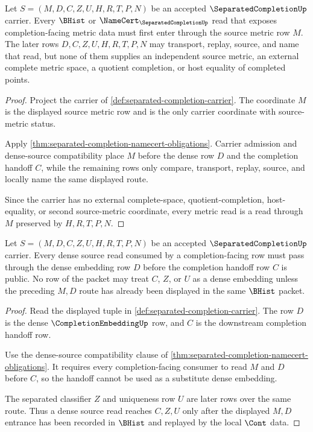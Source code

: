 \begin{theorem}
\label{thm:separated-completion-source-metric-obligation}
Let $S=(M,D,C,Z,U,H,R,T,P,N)$ be an accepted $\SeparatedCompletionUp$ carrier. Every $\BHist$ or $\NameCert_{\SeparatedCompletionUp}$ read that exposes completion-facing metric data must first enter through the source metric row $M$. The later rows $D,C,Z,U,H,R,T,P,N$ may transport, replay, source, and name that read, but none of them supplies an independent source metric, an external complete metric space, a quotient completion, or host equality of completed points.
\end{theorem}
\begin{proof}
Project the carrier of \autoref{def:separated-completion-carrier}. The coordinate $M$ is the displayed source metric row and is the only carrier coordinate with source-metric status.

Apply \autoref{thm:separated-completion-namecert-obligations}. Carrier admission and dense-source compatibility place $M$ before the dense row $D$ and the completion handoff $C$, while the remaining rows only compare, transport, replay, source, and locally name the same displayed route.

Since the carrier has no external complete-space, quotient-completion, host-equality, or second source-metric coordinate, every metric read is a read through $M$ preserved by $H,R,T,P,N$.
\end{proof}

\begin{theorem}
\label{thm:separated-completion-dense-embedding-obligation}
Let $S=(M,D,C,Z,U,H,R,T,P,N)$ be an accepted $\SeparatedCompletionUp$ carrier. Every dense source read consumed by a completion-facing row must pass through the dense embedding row $D$ before the completion handoff row $C$ is public. No row of the packet may treat $C$, $Z$, or $U$ as a dense embedding unless the preceding $M,D$ route has already been displayed in the same $\BHist$ packet.
\end{theorem}
\begin{proof}
Read the displayed tuple in \autoref{def:separated-completion-carrier}. The row $D$ is the dense $\CompletionEmbeddingUp$ row, and $C$ is the downstream completion handoff row.

Use the dense-source compatibility clause of \autoref{thm:separated-completion-namecert-obligations}. It requires every completion-facing consumer to read $M$ and $D$ before $C$, so the handoff cannot be used as a substitute dense embedding.

The separated classifier $Z$ and uniqueness row $U$ are later rows over the same route. Thus a dense source read reaches $C,Z,U$ only after the displayed $M,D$ entrance has been recorded in $\BHist$ and replayed by the local $\Cont$ data.
\end{proof}

